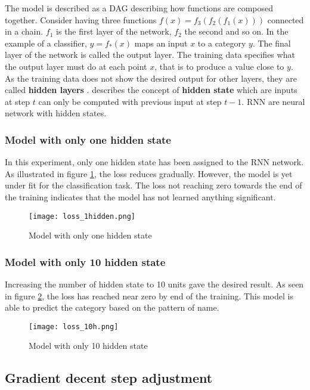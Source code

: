 The model is described as a \acl{DAG} describing how functions are composed together. Consider having three functions $f(x) = f_3(f_2(f_1(x)))$ connected in a chain. $f_1$ is the first layer of the network, $f_2$ the second and so on. In the example of a classifier, $y=f_*(x)$ maps an input $ x $ to a category $ y $. The final layer of the network is called the output layer. The training data specifies what the output layer must do at each point $x$, that is to produce a value close to $y$. As the training data does not show the desired output for other layers, they are called \textbf{hidden layers}  \parencite[Chapter 3]{Goodfellow-et-al-2016}.  \parencite{zhang2021dive} describes the concept of \textbf{hidden state} which are inputs at step $t$ can only be computed with previous input at step $ t-1 $. \acf{RNN} are neural network with hidden states.

\subsubsection{Model with only one hidden state}
In this experiment, only one hidden state has been assigned to the \acs{RNN} network. As illustrated in figure \ref{fig:unihidden}, the loss reduces gradually. However, the model is yet under fit for the classification task. The loss not reaching zero towards the end of the training indicates that the model has not learned anything significant.

\begin{figure}[H]
    \centering    
    \texttt{[image: loss\_1hidden.png]}
    \caption{Model with only one hidden state}
    \label{fig:unihidden}
\end{figure}

\subsubsection{Model with only 10 hidden state}
Increasing the number of hidden state to 10 units gave the desired result.  As seen in figure \ref{fig:10hidden}, the loss has reached near zero by end of the training. This model is able to predict the category based on the pattern of name.
\begin{figure}[H]
    \centering    
    \texttt{[image: loss\_10h.png]}
    \caption{Model with only 10 hidden state}
    \label{fig:10hidden}
\end{figure}

\subsection{Gradient decent step adjustment}

